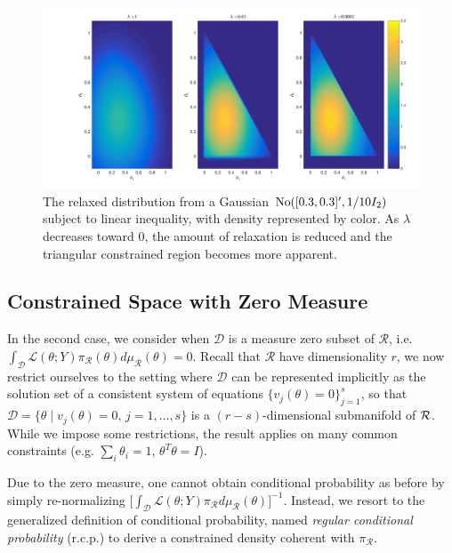 \documentclass[10pt,fleqn]{article} \pdfoutput=1
\DeclareMathOperator{\1}{\mathbbm{1}} \DeclareMathOperator{\bigO}{\mc O}
\begin{document}
\begin{figure}[H] \begin{center}
\includegraphics[width=1\textwidth]{Bivariate_Normal_Triangle_Constraint}
\end{center} \caption{The relaxed distribution from a
Gaussian $\operatorname{No}([0.3,0.3]',1/{10}I_2)$ subject to linear
inequality, with density represented by color. As $\lambda$
decreases toward $0$, the amount of relaxation is reduced
and the triangular constrained region becomes more apparent.}
\label{FIG:Bivariate_Normal_Triangle_Constraint_Relaxation}
\end{figure}

\subsection{Constrained Space with Zero Measure}
\label{SEC:Zero_Measure_Methods}

In the second case, we consider when $\mathcal{D}$
is a measure zero subset of $\mathcal{R}$, i.e.
$\int_\mathcal{D}\mathcal{L}(\theta;Y)\pi_\mathcal{R}(\theta)d\mu_\mathcal{R}(\theta)=0$.
Recall that $\mathcal{R}$ have dimensionality $r$, we now restrict
ourselves to the setting where $\mathcal{D}$ can be represented implicitly
as the solution set of a consistent system of equations $\{v_j(\theta) =
0\}_{j=1}^s$, so that $\mathcal{D} =\{\theta \mid v_j(\theta) =0, \, j =
1, \dots,s\}$ is a $(r-s)$-dimensional submanifold of $\mathcal{R}$.  While we
impose some restrictions, the result applies on many common constraints (e.g.
$\sum_i \theta_i = 1$, $\theta^T\theta=I$).

Due to the zero measure, one cannot obtain
conditional probability as before by simply re-normalizing
$\big[\int_\mathcal{D}\mathcal{L}(\theta;Y)\pi_\mathcal{R}d\mu_\mathcal{R}(\theta)\big]^{-1}.$
Instead, we resort to the generalized definition of conditional
probability, named \emph{regular conditional probability} (r.c.p.)
\citep{kolmogorov1950foundations} to derive a constrained density coherent
with $\pi_\mathcal{R}.$
\end{document}
